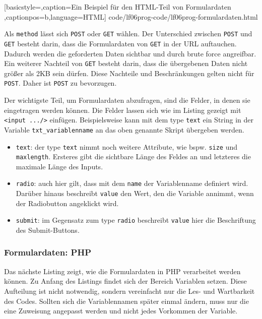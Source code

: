 
	[basicstyle=\small,caption={Ein Beispiel für den HTML-Teil von Formulardaten}
	\label{lst:html-formulardaten},captionpos=b,language=HTML]
	{code/lf06prog-code/lf06prog-formulardaten.html}

Als \texttt{method} lässt sich \texttt{POST} oder \texttt{GET} wählen. Der Unterschied zwischen \texttt{POST} und \texttt{GET} besteht darin, dass die Formulardaten von \texttt{GET} in der URL auftauchen. Dadurch werden die geforderten Daten sichtbar und durch brute force angreifbar. Ein weiterer Nachteil von \texttt{GET} besteht darin, dass die übergebenen Daten nicht größer als 2KB sein dürfen. Diese Nachteile und Beschränkungen gelten nicht für \texttt{POST}. Daher ist \texttt{POST} zu bevorzugen.

Der wichtigste Teil, um Formulardaten abzufragen, sind die Felder, in denen sie eingetragen werden können. Die Felder lassen sich wie im Listing gezeigt mit \texttt{<input .../>} einfügen. Beispielsweise kann mit dem type \texttt{text} ein String in der Variable \texttt{txt\_variablenname} an das oben genannte Skript übergeben werden.
\begin{itemize}
	\item \texttt{text}: der type \texttt{text} nimmt noch weitere Attribute, wie bspw. \texttt{size} und \texttt{maxlength}. Ersteres gibt die sichtbare Länge des Feldes an und letzteres die maximale Länge des Inputs.
	\item \texttt{radio}: auch hier gilt, dass mit dem \texttt{name} der Variablenname definiert wird. Darüber hinaus beschreibt \texttt{value} den Wert, den die Variable annimmt, wenn der Radiobutton angeklickt wird.
	\item \texttt{submit}: im Gegensatz zum type \texttt{radio} beschreibt \texttt{value} hier die Beschriftung des Submit-Buttons.
\end{itemize} 

\subsubsection{Formulardaten: PHP}

Das nächste Listing zeigt, wie die Formulardaten in PHP verarbeitet werden können. Zu Anfang des Listings findet sich der Bereich \ql Variablen setzen\qr. Diese Aufteilung ist nicht notwendig, sondern vereinfacht nur die Les- und Wartbarkeit des Codes. Sollten sich die Variablennamen später einmal ändern, muss nur die eine Zuweisung angepasst werden und nicht jedes Vorkommen der Variable.


